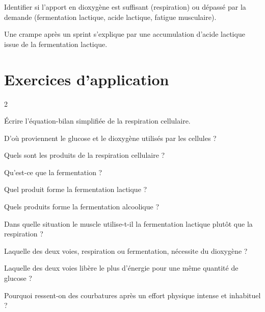 Identifier si l'apport en dioxygène est suffisant (respiration) ou dépassé par la demande
(fermentation lactique, acide lactique, fatigue musculaire).
\begin{exemple}
Une crampe après un sprint s'explique par une accumulation d'acide lactique issue de la
fermentation lactique.
\end{exemple}

\section{Exercices d'application}
\begin{multicols}{2}

\exo{} Écrire l'équation-bilan simplifiée de la respiration cellulaire.

\exo{} D'où proviennent le glucose et le dioxygène utilisés par les cellules ?

\exo{} Quels sont les produits de la respiration cellulaire ?

\exo{} Qu'est-ce que la fermentation ?

\exo{} Quel produit forme la fermentation lactique ?

\exo{} Quels produits forme la fermentation alcoolique ?

\exo{} Dans quelle situation le muscle utilise-t-il la fermentation lactique
plutôt que la respiration ?

\exo{} Laquelle des deux voies, respiration ou fermentation, nécessite du
dioxygène ?

\exo{} Laquelle des deux voies libère le plus d'énergie pour une même quantité de
glucose ?

\exo{} Pourquoi ressent-on des courbatures après un effort physique intense et
inhabituel ?

\end{multicols}

